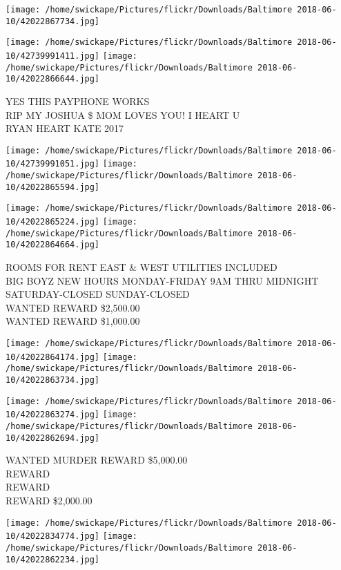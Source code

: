 \documentclass[10pt,letterpaper]{article}
\begin{document}
\texttt{[image: /home/swickape/Pictures/flickr/Downloads/Baltimore 2018-06-10/42022867734.jpg]}

\vspace{0.25in}
\texttt{[image: /home/swickape/Pictures/flickr/Downloads/Baltimore 2018-06-10/42739991411.jpg]}
\texttt{[image: /home/swickape/Pictures/flickr/Downloads/Baltimore 2018-06-10/42022866644.jpg]}

YES THIS PAYPHONE WORKS\\
RIP MY JOSHUA \$ MOM LOVES YOU!  I HEART U\\
RYAN HEART KATE 2017\\
\pagebreak

\texttt{[image: /home/swickape/Pictures/flickr/Downloads/Baltimore 2018-06-10/42739991051.jpg]}
\texttt{[image: /home/swickape/Pictures/flickr/Downloads/Baltimore 2018-06-10/42022865594.jpg]}

\texttt{[image: /home/swickape/Pictures/flickr/Downloads/Baltimore 2018-06-10/42022865224.jpg]}
\texttt{[image: /home/swickape/Pictures/flickr/Downloads/Baltimore 2018-06-10/42022864664.jpg]}

ROOMS FOR RENT EAST \& WEST UTILITIES INCLUDED\\
BIG BOYZ NEW HOURS MONDAY{-}FRIDAY 9AM THRU MIDNIGHT SATURDAY{-}CLOSED SUNDAY{-}CLOSED\\
WANTED REWARD \$2,500.00\\
WANTED REWARD \$1,000.00\\
\pagebreak

\texttt{[image: /home/swickape/Pictures/flickr/Downloads/Baltimore 2018-06-10/42022864174.jpg]}
\texttt{[image: /home/swickape/Pictures/flickr/Downloads/Baltimore 2018-06-10/42022863734.jpg]}

\texttt{[image: /home/swickape/Pictures/flickr/Downloads/Baltimore 2018-06-10/42022863274.jpg]}
\texttt{[image: /home/swickape/Pictures/flickr/Downloads/Baltimore 2018-06-10/42022862694.jpg]}

WANTED MURDER REWARD \$5,000.00\\
REWARD\\
REWARD\\
REWARD \$2,000.00\\
\pagebreak

\texttt{[image: /home/swickape/Pictures/flickr/Downloads/Baltimore 2018-06-10/42022834774.jpg]}
\texttt{[image: /home/swickape/Pictures/flickr/Downloads/Baltimore 2018-06-10/42022862234.jpg]}
\end{document}
